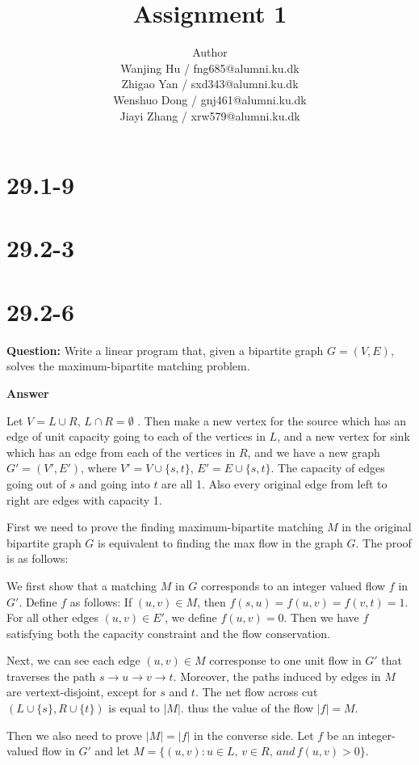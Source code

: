 \documentclass[12pt]{article}
\title{Assignment 1}
\author{Author \\
  Wanjing Hu / fng685@alumni.ku.dk  \\
  Zhigao Yan / sxd343@alumni.ku.dk  \\
  Wenshuo Dong / gnj461@alumni.ku.dk  \\
  Jiayi Zhang / xrw579@alumni.ku.dk \\
}
\begin{document}
\maketitle

\section{29.1-9}

\section{29.2-3}

\section{29.2-6}
\textbf{Question:}
Write a linear program that, given a bipartite graph $G = (V,E)$, solves the maximum-bipartite matching problem.

\textbf{Answer}

Let $V = L \cup R$, $L \cap R = \emptyset$ . Then make a new vertex for the source which has an edge of unit capacity going to each of the vertices in $L$, and a new vertex for sink which has an edge from each of the vertices in $R$, and we have a new graph $G'=(V',E')$, where $V' = V \cup \{s,t\}$, $E' = E \cup \{s, t\}$. The capacity of edges going out of $s$ and going into $t$ are all 1. Also every original edge from left to right are edges with capacity 1.

First we need to prove the finding maximum-bipartite matching $M$ in the original bipartite graph $G$ is equivalent to finding the max flow in the graph $G$. The proof is as follows:

We first show that a matching $M$ in $G$ corresponds to an integer valued flow $f$ in $G'$. Define $f$ as follows: If $(u,v) \in M$, then $f(s,u) = f(u,v) = f(v,t) = 1$. For all other edges $(u,v) \in E'$, we define $f(u,v) = 0$. Then we have $f$ satisfying both the capacity constraint and the flow conservation.

Next, we can see each edge $(u,v) \in M$ corresponse to one unit flow in $G'$ that traverses the path $s \rightarrow u \rightarrow v \rightarrow t$. Moreover, the paths induced by edges in $M$ are vertext-disjoint, except for $s$ and $t$. The net flow across cut $(L \cup \{s\}, R \cup \{t\})$ is equal to $|M|$. thus the value of the flow $|f| = M$. 

Then we also need to prove $|M| = |f|$ in the converse side. Let $f$ be an integer-valued flow in $G'$ and let $M = \{(u,v): u \in L,\, v \in R,\, and\, f(u,v) >0\}$.
\end{document}
